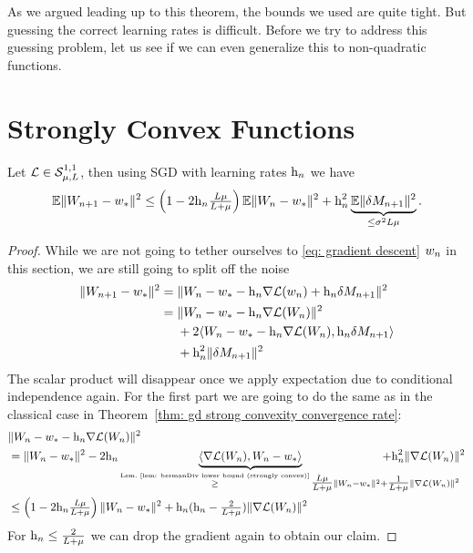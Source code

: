 As we argued leading up to this theorem, the bounds
we used are quite tight. But guessing the correct learning rates is difficult.
Before we try to address this guessing problem, let us see if we can even
generalize this to non-quadratic functions.


\section{Strongly Convex Functions}

\begin{lemma}\label{lem: SGD bound with noise}
	Let \(\mathcal{L}\in\mathcal{S}^{1,1}_{{\mu},{L}}\), then using SGD with learning
	rates \(\text{h}_n\) we have
	\begin{align*}
		\mathbb{E}\|W_{n+1} - w_*\|^2
		\le \left(1-2\text{h}_n\tfrac{L\mu}{L+\mu}\right)
		\mathbb{E}\|W_n - w_*\|^2 + \text{h}_n^2 \underbrace{\mathbb{E}\|\delta M_{n+1}\|^2}_{\le\sigma^2L\mu}.
	\end{align*}
\end{lemma}
\begin{proof}
	While we are not going to tether ourselves to \ref{eq: gradient descent} \(w_n\) in
	this section, we are still going to split off the noise
	\begin{align*}
		\|W_{n+1} - w_*\|^2
		&= \|W_n -w_* - \text{h}_n\nabla\mathcal{L}(w_n) +\text{h}_n \delta M_{n+1}\|^2\\
		&= \begin{aligned}[t]
			&\|W_n - w_* - \text{h}_n\nabla\mathcal{L}(W_n)\|^2\\
			&+ 2\langle W_n - w_* - \text{h}_n\nabla\mathcal{L}(W_n), \text{h}_n \delta M_{n+1}\rangle\\
			&+ \text{h}_n^2 \|\delta M_{n+1}\|^2
		\end{aligned}
	\end{align*}
	The scalar product will disappear once we apply expectation due to conditional
	independence again. For the first part we are going to do the same as in the
	classical case in Theorem~\ref{thm: gd strong convexity convergence rate}:
	\begin{align}
		\nonumber
		&\|\Weights_n - \minimum - \lr_n\nabla\Loss(\Weights_n)\|^2\\
		\label{eq: getting rid of the scalar product (SGD)}
		&= \|\Weights_n - \minimum\|^2
		- 2\lr_n\underbrace{\langle\nabla\Loss(\Weights_n), \Weights_n-\minimum\rangle}_{
			\xge{\text{Lem.~\ref{lem: bermanDiv lower bound (strongly convex)}}}
			\tfrac{\ubound\lbound}{\ubound+\lbound}\|\Weights_n - \minimum\|^2
			\mathrlap{+ \tfrac{1}{\ubound+\lbound}\|\nabla\Loss(\Weights_n)\|^2}
		}
		+ \lr_n^2 \|\nabla\Loss(\Weights_n)\|^2\\
		\nonumber
		&\le \left(1-2\lr_n\tfrac{\ubound\lbound}{\ubound+\lbound}\right)
		\|\Weights_n - \minimum\|^2
		+ \lr_n(\lr_n - \tfrac{2}{\ubound+\lbound})
		\|\nabla\Loss(\Weights_n)\|^2
	\end{align}
	For \(\text{h}_n\le\tfrac{2}{L+\mu}\) we can drop the gradient again to
	obtain our claim.
\end{proof}

